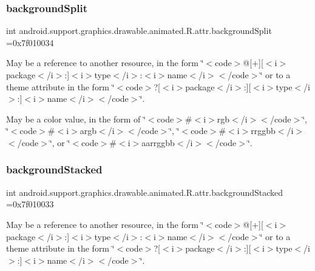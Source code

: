 \subsubsection{\texorpdfstring{background\+Split}{backgroundSplit}}
{\footnotesize\ttfamily int android.\+support.\+graphics.\+drawable.\+animated.\+R.\+attr.\+background\+Split =0x7f010034\hspace{0.3cm}{\ttfamily [static]}}

May be a reference to another resource, in the form \char`\"{}$<$code$>$@\mbox{[}+\mbox{]}\mbox{[}$<$i$>$package$<$/i$>$\+:\mbox{]}$<$i$>$type$<$/i$>$\+:$<$i$>$name$<$/i$>$$<$/code$>$\char`\"{} or to a theme attribute in the form \char`\"{}$<$code$>$?\mbox{[}$<$i$>$package$<$/i$>$\+:\mbox{]}\mbox{[}$<$i$>$type$<$/i$>$\+:\mbox{]}$<$i$>$name$<$/i$>$$<$/code$>$\char`\"{}. 

May be a color value, in the form of \char`\"{}$<$code$>$\#$<$i$>$rgb$<$/i$>$$<$/code$>$\char`\"{}, \char`\"{}$<$code$>$\#$<$i$>$argb$<$/i$>$$<$/code$>$\char`\"{}, \char`\"{}$<$code$>$\#$<$i$>$rrggbb$<$/i$>$$<$/code$>$\char`\"{}, or \char`\"{}$<$code$>$\#$<$i$>$aarrggbb$<$/i$>$$<$/code$>$\char`\"{}. \mbox{\label{classandroid_1_1support_1_1graphics_1_1drawable_1_1animated_1_1R_1_1attr_a959e51e3c815d76970b6bd64c8009366}} 
\subsubsection{\texorpdfstring{background\+Stacked}{backgroundStacked}}
{\footnotesize\ttfamily int android.\+support.\+graphics.\+drawable.\+animated.\+R.\+attr.\+background\+Stacked =0x7f010033\hspace{0.3cm}{\ttfamily [static]}}

May be a reference to another resource, in the form \char`\"{}$<$code$>$@\mbox{[}+\mbox{]}\mbox{[}$<$i$>$package$<$/i$>$\+:\mbox{]}$<$i$>$type$<$/i$>$\+:$<$i$>$name$<$/i$>$$<$/code$>$\char`\"{} or to a theme attribute in the form \char`\"{}$<$code$>$?\mbox{[}$<$i$>$package$<$/i$>$\+:\mbox{]}\mbox{[}$<$i$>$type$<$/i$>$\+:\mbox{]}$<$i$>$name$<$/i$>$$<$/code$>$\char`\"{}. 


